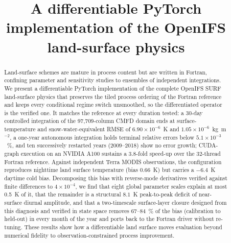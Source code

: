 \documentclass[gmd, manuscript]{copernicus}
\begin{document}
\title{A differentiable PyTorch implementation of the OpenIFS land-surface physics}




\received{}
\pubdiscuss{}
\revised{}
\accepted{}
\published{}


\maketitle

\begin{abstract}
Land-surface schemes are mature in process content but are written in
Fortran, confining parameter and sensitivity studies to ensembles of
independent integrations. We present a differentiable PyTorch implementation
of the complete OpenIFS SURF land-surface physics that preserves the tiled
process ordering of the Fortran reference and keeps every conditional regime
switch unsmoothed, so the differentiated operator is the verified one. It
matches the reference at every duration tested: a 30-day controlled
integration of the 97,709-column CMFD domain ends at surface-temperature and
snow-water-equivalent RMSE of $6.90\times10^{-6}$~K and
$1.05\times10^{-6}$~kg~m$^{-2}$, a one-year autonomous integration holds
terminal relative errors below $5.1\times10^{-3}$~\%, and ten successively
restarted years (2009--2018) show no error growth; CUDA-graph execution on
an NVIDIA A100 sustains a 3.8-fold speed-up over the 32-thread Fortran
reference. Against independent Terra MODIS observations, the configuration
reproduces nighttime land surface temperature (bias 0.66~K) but carries a
$-6.4$~K daytime cold bias. Decomposing this bias with reverse-mode
derivatives verified against finite differences to $4\times10^{-4}$, we
find that eight global parameter scales explain at most 0.5~K of it, that
the remainder is a structural $8.1$~K peak-to-peak deficit of near-surface
diurnal amplitude, and that a two-timescale surface-layer closure designed
from this diagnosis and verified in state space removes 67--84~\% of the
bias (calibration to held-out) in every month of the year and ports back to
the Fortran driver without re-tuning. These results show how a
differentiable land surface moves evaluation beyond numerical fidelity to
observation-constrained process improvement.
\end{abstract}
\end{document}
